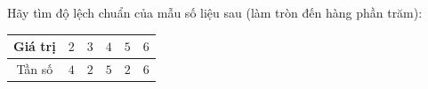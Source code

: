 \begin{ex}
Hãy tìm độ lệch chuẩn của mẫu số liệu sau (làm tròn đến hàng phần trăm):
\begin{center}
\begin{tabular}{|c|c|c|c|c|c|}\hline
Giá trị & $2$ & $3$ & $4$ & $5$ & $6$\\\hline
Tần số & $4$ & $2$ & $5$ & $2$ & $6$\\\hline
\end{tabular}
\end{center}
\end{ex}
